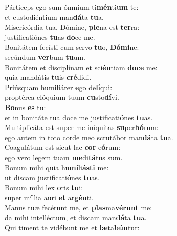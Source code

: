 \oddverse Párticeps ego sum ómnium ti\textbf{mén}ti\textbf{um} te:~\*\\
\oddverse et custodiéntium man\textbf{dá}ta \textbf{tu}a.\\
\evenverse Misericórdia tua, Dómine, \textbf{ple}na est \textbf{ter}ra:~\*\\
\evenverse justificatiónes \textbf{tu}as \textbf{do}ce me.\\
\oddverse Bonitátem fecísti cum servo \textbf{tu}o, \textbf{Dó}\textbf{mi}ne:~\*\\
\oddverse secúndum \textbf{ver}bum \textbf{tu}um.\\
\evenverse Bonitátem et disciplínam et sci\textbf{én}tiam \textbf{do}\textbf{ce} me:~\*\\
\evenverse quia mandátis \textbf{tu}is \textbf{cré}didi.\\
\oddverse Priúsquam humiliárer \textbf{e}go de\textbf{lí}qui:~\*\\
\oddverse proptérea elóquium tuum \textbf{cu}sto\textbf{dí}vi.\\
\evenverse \textbf{Bo}nus \textbf{es} tu:~\*\\
\evenverse et in bonitáte tua doce me justificati\textbf{ó}nes \textbf{tu}as.\\
\oddverse Multiplicáta est super me iníquitas \textbf{su}per\textbf{bó}rum:~\*\\
\oddverse ego autem in toto corde meo scrutábor man\textbf{dá}ta \textbf{tu}a.\\
\evenverse Coagulátum est sicut lac \textbf{cor} e\textbf{ó}rum:~\*\\
\evenverse ego vero legem tuam \textbf{me}di\textbf{tá}tus sum.\\
\oddverse Bonum mihi quia hu\textbf{mi}li\textbf{á}\textbf{sti} me:~\*\\
\oddverse ut discam justificati\textbf{ó}nes \textbf{tu}as.\\
\evenverse Bonum mihi lex \textbf{o}ris \textbf{tu}i:~\*\\
\evenverse super míllia auri \textbf{et} ar\textbf{gén}ti.\\
\oddverse Manus tuæ fecérunt me, et \textbf{plas}ma\textbf{vé}\textbf{runt} me:~\*\\
\oddverse da mihi intelléctum, et discam man\textbf{dá}ta \textbf{tu}a.\\
\evenverse Qui timent te vidébunt me et \textbf{læ}ta\textbf{bún}tur:~\*\\
